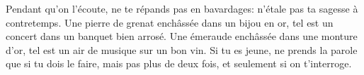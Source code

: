 Pendant qu’on l’écoute, ne te répands pas en bavardages:
	n’étale pas ta sagesse à contretemps.
Une pierre de grenat enchâssée dans un bijou en or,
	tel est un concert dans un banquet bien arrosé.
Une émeraude enchâssée dans une monture d’or,
	tel est un air de musique sur un bon vin.
Si tu es jeune, ne prends la parole que si tu dois le faire,
	mais pas plus de deux fois, et seulement si on t’interroge.

